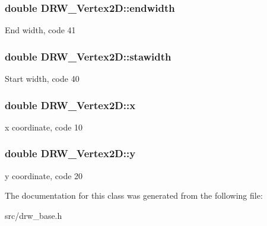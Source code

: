 \subsubsection[{endwidth}]{\setlength{\rightskip}{0pt plus 5cm}double D\+R\+W\+\_\+\+Vertex2\+D\+::endwidth}\label{class_d_r_w___vertex2_d_a810d285d1f81da75a895ade902e8d159}
End width, code 41 \hypertarget{class_d_r_w___vertex2_d_a5d3c878a768fa6c10f158a2bbd9726ca}{}
\subsubsection[{stawidth}]{\setlength{\rightskip}{0pt plus 5cm}double D\+R\+W\+\_\+\+Vertex2\+D\+::stawidth}\label{class_d_r_w___vertex2_d_a5d3c878a768fa6c10f158a2bbd9726ca}
Start width, code 40 \hypertarget{class_d_r_w___vertex2_d_abe6dee44053f5d82387209e7c76186c8}{}
\subsubsection[{x}]{\setlength{\rightskip}{0pt plus 5cm}double D\+R\+W\+\_\+\+Vertex2\+D\+::x}\label{class_d_r_w___vertex2_d_abe6dee44053f5d82387209e7c76186c8}
x coordinate, code 10 \hypertarget{class_d_r_w___vertex2_d_a45e73443961543c05bff340dfe14cb8e}{}
\subsubsection[{y}]{\setlength{\rightskip}{0pt plus 5cm}double D\+R\+W\+\_\+\+Vertex2\+D\+::y}\label{class_d_r_w___vertex2_d_a45e73443961543c05bff340dfe14cb8e}
y coordinate, code 20 

The documentation for this class was generated from the following file\+:\begin{DoxyCompactItemize}
\item 
src/drw\+\_\+base.\+h\end{DoxyCompactItemize}
